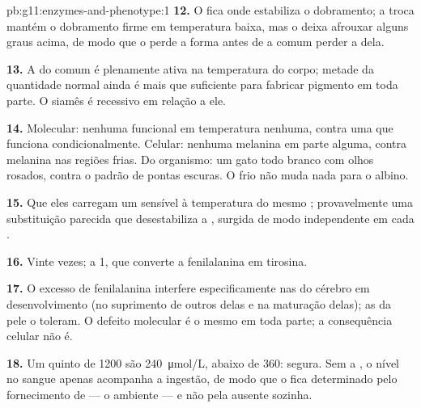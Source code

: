 \begin{solution}{pb:g11:enzymes-and-phenotype:1}
\textbf{12.} O  fica onde estabiliza o dobramento; a troca
mantém o dobramento firme em temperatura baixa, mas o deixa afrouxar
alguns graus acima, de modo que o  perde a forma antes de a
 comum perder a dela.

\textbf{13.} A  do  comum é plenamente ativa na temperatura
do corpo; metade da quantidade normal ainda é mais que suficiente para
fabricar pigmento em toda parte. O  siamês é recessivo em relação
a ele.

\textbf{14.} Molecular: nenhuma  funcional em temperatura
nenhuma, contra uma que funciona condicionalmente. Celular: nenhuma
melanina em parte alguma, contra melanina nas regiões frias. Do
organismo: um gato todo branco com olhos rosados, contra o padrão de
pontas escuras. O frio não muda nada para o albino.

\textbf{15.} Que eles carregam um  sensível à temperatura do mesmo
; provavelmente uma substituição parecida que desestabiliza a
, surgida de modo independente em cada .

\textbf{16.} Vinte vezes; a  1, que converte a fenilalanina em
tirosina.

\textbf{17.} O excesso de fenilalanina interfere especificamente nas
 do cérebro em desenvolvimento (no suprimento de outros
 delas e na maturação delas); as  da pele o toleram.
O defeito molecular é o mesmo em toda parte; a consequência celular não é.

\textbf{18.} Um quinto de \num{1200} são \qty{240}{\micro mol/L},
abaixo de \num{360}: segura. Sem a , o nível no sangue apenas
acompanha a ingestão, de modo que o  fica determinado pelo
fornecimento de  --- o ambiente --- e não pela  ausente
sozinha.


\end{solution}
